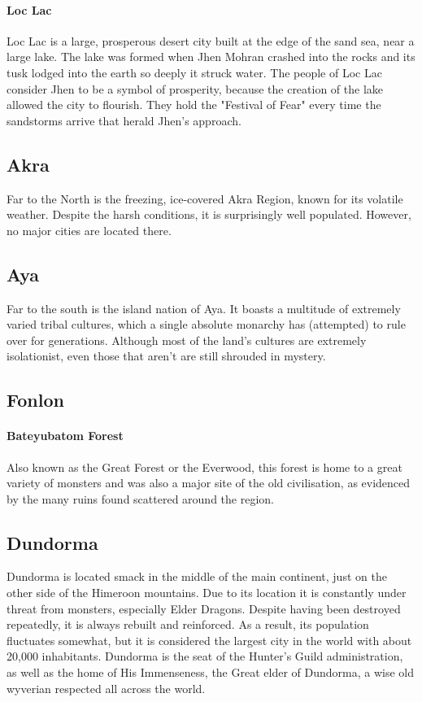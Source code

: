 \paragraph{Loc Lac} Loc Lac is a large, prosperous desert city built at the edge of the sand sea, near a large lake. The lake was formed when Jhen Mohran crashed into the rocks and its tusk lodged into the earth so deeply it struck water. The people of Loc Lac consider Jhen to be a symbol of prosperity, because the creation of the lake allowed the city to flourish. They hold the "Festival of Fear" every time the sandstorms arrive that herald Jhen's approach.

\subsection*{Akra}
Far to the North is the freezing, ice-covered Akra Region, known for its volatile weather. Despite the harsh conditions, it is surprisingly well populated. However, no major cities are located there.

\subsection*{Aya}
Far to the south is the island nation of Aya. It boasts a multitude of extremely varied tribal cultures, which a single absolute monarchy has (attempted) to rule over for generations.  Although most of the land's cultures are extremely isolationist, even those that aren't are still shrouded in mystery.

\subsection*{Fonlon}
\paragraph{Bateyubatom Forest} Also known as the Great Forest or the Everwood, this forest is home to a great variety of monsters and was also a major site of the old civilisation, as evidenced by the many ruins found scattered around the region.

\subsection*{Dundorma} Dundorma is located smack in the middle of the main continent, just on the other side of the Himeroon mountains. Due to its location it is constantly under threat from monsters, especially Elder Dragons. Despite having been destroyed repeatedly, it is always rebuilt and reinforced. As a result, its population fluctuates somewhat, but it is considered the largest city in the world with about 20,000 inhabitants. Dundorma is the seat of the Hunter's Guild administration, as well as the home of His Immenseness, the Great elder of Dundorma, a wise old wyverian respected all across the world.

